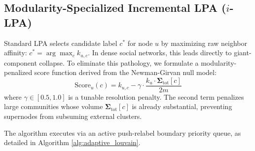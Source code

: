 \documentclass[10pt,journal,compsoc]{IEEEtran}
\begin{document}
\subsection{Modularity-Specialized Incremental LPA ($i$-LPA)}
Standard LPA selects candidate label $c^*$ for node $u$ by maximizing raw neighbor affinity: $c^* = \arg\max_c k_{u, c}$. In dense social networks, this leads directly to giant-component collapse. To eliminate this pathology, we formulate a modularity-penalized score function derived from the Newman-Girvan null model:
\begin{equation}
\text{Score}_u(c) = k_{u, c} - \gamma \cdot \frac{k_u \cdot \bm{\Sigma}_{\text{tot}}[c]}{2m}
\label{eq:ilpa_score}
\end{equation}
where $\gamma \in [0.5, 1.0]$ is a tunable resolution penalty. The second term penalizes large communities whose volume $\bm{\Sigma}_{\text{tot}}[c]$ is already substantial, preventing supernodes from subsuming external clusters.

The algorithm executes via an active push-relabel boundary priority queue, as detailed in Algorithm \ref{alg:adaptive_louvain}.
\end{document}
